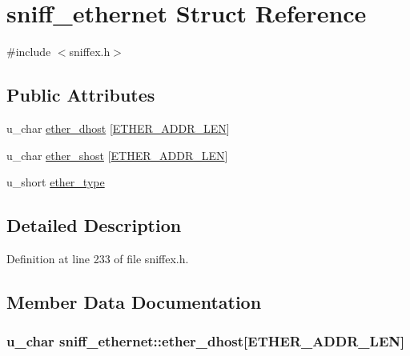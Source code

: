 \hypertarget{structsniff__ethernet}{}\section{sniff\+\_\+ethernet Struct Reference}
\label{structsniff__ethernet}


{\ttfamily \#include $<$sniffex.\+h$>$}

\subsection*{Public Attributes}
\begin{DoxyCompactItemize}
\item 
u\+\_\+char \hyperlink{structsniff__ethernet_aefda8dbb54243c93c4d267ada25ba17f}{ether\+\_\+dhost} \mbox{[}\hyperlink{sniffex_8h_abf4fcaacb1ad2010711b7c880ec2ed20}{E\+T\+H\+E\+R\+\_\+\+A\+D\+D\+R\+\_\+\+L\+EN}\mbox{]}
\item 
u\+\_\+char \hyperlink{structsniff__ethernet_afe9a93573af998a8652b2c8b1694dd51}{ether\+\_\+shost} \mbox{[}\hyperlink{sniffex_8h_abf4fcaacb1ad2010711b7c880ec2ed20}{E\+T\+H\+E\+R\+\_\+\+A\+D\+D\+R\+\_\+\+L\+EN}\mbox{]}
\item 
u\+\_\+short \hyperlink{structsniff__ethernet_ae66770fd4e71d27c6a6619670bac2efb}{ether\+\_\+type}
\end{DoxyCompactItemize}


\subsection{Detailed Description}


Definition at line 233 of file sniffex.\+h.



\subsection{Member Data Documentation}
\subsubsection[{\texorpdfstring{ether\+\_\+dhost}{ether_dhost}}]{\setlength{\rightskip}{0pt plus 5cm}u\+\_\+char sniff\+\_\+ethernet\+::ether\+\_\+dhost\mbox{[}{\bf E\+T\+H\+E\+R\+\_\+\+A\+D\+D\+R\+\_\+\+L\+EN}\mbox{]}}\hypertarget{structsniff__ethernet_aefda8dbb54243c93c4d267ada25ba17f}{}\label{structsniff__ethernet_aefda8dbb54243c93c4d267ada25ba17f}



